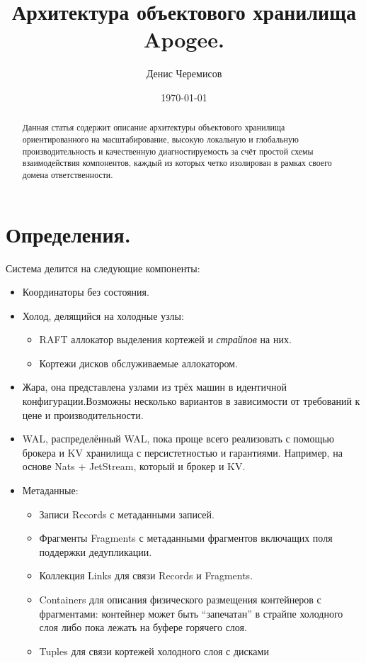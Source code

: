 \documentclass[a4paper,12pt]{article}
\title{Архитектура объектового хранилища Apogee.}
\author{Денис Черемисов}
\date{\today}
\begin{document}
    \maketitle

    \begin{abstract}
        Данная статья содержит описание архитектуры объектового хранилища ориентированного на масштабирование, высокую локальную и глобальную производительность и качественную диагностируемость
        за счёт простой схемы взаимодействия компонентов, каждый из которых четко изолирован в рамках своего домена ответственности.
    \end{abstract}

    \newpage
    \tableofcontents
    \newpage  %


    \section{Определения.}

    Система делится на следующие компоненты:

    \begin{itemize}
        \item Координаторы без состояния.

        \item Холод, делящийся на холодные узлы:
        \begin{itemize}
            \item RAFT аллокатор выделения кортежей и \textit{страйпов} на них.
            \item Кортежи дисков обслуживаемые аллокатором.
        \end{itemize}

        \item Жара, она представлена узлами из трёх машин в идентичной конфигурации.Возможны несколько вариантов в зависимости от требований к цене и производительности.

        \item WAL, распределённый WAL, пока проще всего реализовать с помощью брокера и KV хранилища с персистетностью и гарантиями. Например, на основе Nats + JetStream, который и брокер и KV.

        \item Метаданные:
        \begin{itemize}
            \item Записи Records с метаданными записей.
            \item Фрагменты Fragments с метаданными фрагментов включащих поля поддержки дедупликации.
            \item Коллекция Links для связи Records и Fragments.
            \item Containers для описания физического размещения контейнеров с фрагментами: контейнер может быть \enquote{запечатан} в страйпе холодного слоя либо пока лежать на буфере горячего слоя.
            \item Tuples для связи кортежей холодного слоя с дисками
        \end{itemize}
    \end{itemize}
\end{document}
